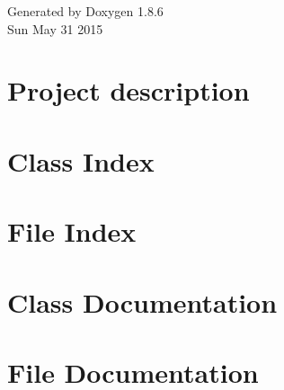 \documentclass[twoside]{book}
\newcommand{\clearemptydoublepage}{%
  \newpage{\pagestyle{empty}\cleardoublepage}%
}
\begin{document}
\begin{titlepage}
\begin{center}
\vfill

{\large Generated by Doxygen 1.8.6}\\
\vspace*{0.5cm}
{\small Sun May 31 2015}\\

\end{center}



\end{titlepage}
\clearemptydoublepage
\tableofcontents
\clearemptydoublepage
{}
\hypersetup{pageanchor=true}

\chapter{Project description}
\label{index}\hypertarget{index}{}
\chapter{Class Index}

\chapter{File Index}

\chapter{Class Documentation}




\chapter{File Documentation}




















\newpage
{}
{}
\printindex
\end{document}
